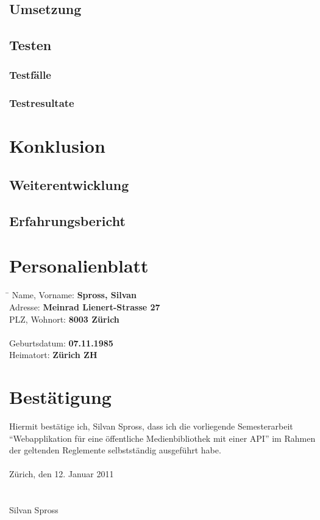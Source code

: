 \documentclass[abstracton,liststotoc,bibtotoc]{scrreprt}
\begin{document}
    \section{Umsetzung}
    \section{Testen}
    \subsection{Testfälle}
    \subsection{Testresultate}
    
    \chapter{Konklusion}
    \section{Weiterentwicklung}
    \section{Erfahrungsbericht}
    
    \appendix
    
    \chapter{Personalienblatt}
    \begin{tabbing}
    	\hspace*{4cm}   \= \kill
    	Name, Vorname:  \> {\bf Spross, Silvan} \\
    	Adresse:        \> {\bf Meinrad Lienert-Strasse 27} \\
    	PLZ, Wohnort:   \> {\bf 8003 Zürich} \\
    	\\
    	Geburtsdatum:   \> {\bf 07.11.1985} \\
    	Heimatort:      \> {\bf Zürich ZH} \\
    \end{tabbing}
    
    \chapter{Bestätigung}
    Hiermit bestätige ich, Silvan Spross, dass ich die vorliegende Semesterarbeit
    "`Webapplikation für eine öffentliche Medienbibliothek mit einer API"' im
    Rahmen der geltenden Reglemente selbstständig ausgeführt habe.\\
    \\
    Zürich, den 12. Januar 2011\\
    \\\\
    Silvan Spross
    
    \listoffigures

    \listoftables
    
    
    
    
\end{document}
